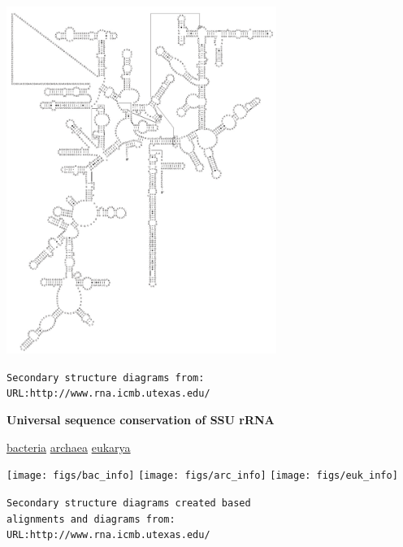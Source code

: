 \documentclass[landscape]{slides}
\begin{document}
\begin{slide}
\begin{center}
\includegraphics[height=4.45in]{figs/zmays_16S_man}
\end{center}

\begin{flushright}
\tiny{\texttt{Secondary structure diagrams from:}} \\
\tiny{\texttt{URL:http://www.rna.icmb.utexas.edu/}}
\end{flushright}
\vfill
\end{slide}

\begin{slide}
\begin{center}
\large
\textbf{Universal sequence conservation of SSU rRNA}
\end{center}
\vspace{0.5in}
\small
\hspace{1.5in}
\underline{bacteria}
\hspace{2.2in}
\underline{archaea}
\hspace{2.2in}
\underline{eukarya}

\begin{center}
\texttt{[image: figs/bac\_info]}
\texttt{[image: figs/arc\_info]}
\texttt{[image: figs/euk\_info]}
\end{center}

\begin{flushright}
\tiny{\texttt{Secondary structure diagrams created based}} \\
\tiny{\texttt{alignments and diagrams from:}} \\
\tiny{\texttt{URL:http://www.rna.icmb.utexas.edu/}}
\end{flushright}
\vfill
\end{slide}
\end{document}
